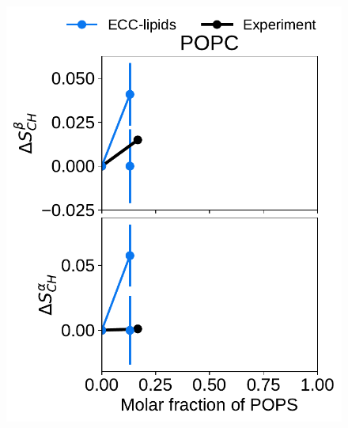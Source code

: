 \begin{figure}[htb!] 
  \centering 
  \includegraphics[width=\figwidth]{../img/ecc_pops/l17/order_parameters_changes_A-B_PC-PS_mix_POPC_nacl.pdf} 

\end{figure}
